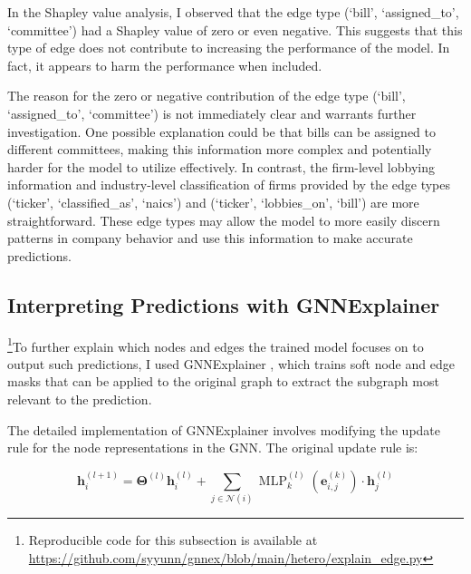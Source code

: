 \documentclass[15pt,letterpaper]{article}
\begin{document}
In the Shapley value analysis, I observed that the edge type (`bill', `assigned\_to', `committee') had a Shapley value of zero or even negative. This suggests that this type of edge does not contribute to increasing the performance of the model. In fact, it appears to harm the performance when included.


The reason for the zero or negative contribution of the edge type (`bill', `assigned\_to', `committee') is not immediately clear and warrants further investigation. 
One possible explanation could be that bills can be assigned to different committees, making this information more complex and potentially harder for the model to utilize effectively. 
In contrast, the firm-level lobbying information and industry-level classification of firms provided by the edge types (`ticker', `classified\_as', `naics') and (`ticker', `lobbies\_on', `bill') are more straightforward. These edge types may allow the model to more easily discern patterns in company behavior and use this information to make accurate predictions.

\subsection{Interpreting Predictions with GNNExplainer}

\footnote{Reproducible code for this subsection is available at \url{https://github.com/syyunn/gnnex/blob/main/hetero/explain_edge.py}}To further explain which nodes and edges the trained model focuses on to output such predictions, I used GNNExplainer \citep{gex}, which trains soft node and edge masks that can be applied to the original graph to extract the subgraph most relevant to the prediction.

The detailed implementation of GNNExplainer involves modifying the update rule for the node representations in the GNN. The original update rule is:

$$
\mathbf{h}_i^{(l+1)}=\boldsymbol{\Theta}^{(l)} \mathbf{h}_i^{(l)}+\sum_{j \in \mathcal{N}(i)} \operatorname{MLP}_k^{(l)}\left(\mathbf{e}_{i, j}^{(k)}\right) \cdot \mathbf{h}_j^{(l)}
$$
\end{document}
